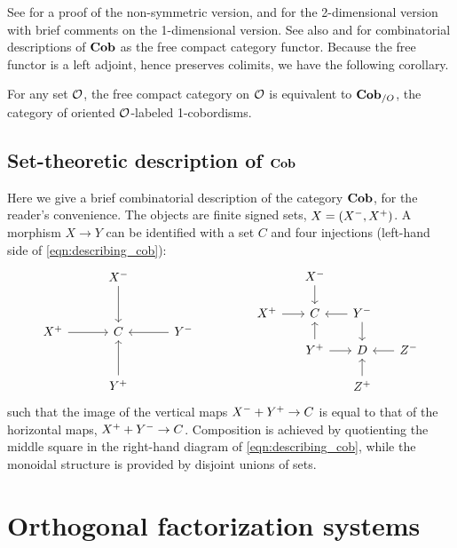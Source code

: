 \documentclass[11pt,oneside,article]{memoir}
\begin{document}
See \cite[Theorem 3.6]{FreydYetter} for a proof of the non-symmetric version, \cite{Kock} and
\cite{BaezDolan} for the 2-dimensional version with brief comments on the 1-dimensional version. See
also \cite{KellyLaplaza} and \cite{Abramsky2} for combinatorial descriptions of $\mathbf{Cob}$ as the free
compact category functor.  Because the free functor is a left adjoint, hence preserves colimits, we
have the following corollary.

\begin{corollary}
      \label{cor:free_compact_is_Cob}
   For any set $\mathcal{O}$, the free compact category on $\mathcal{O}$ is equivalent to $\mathbf{Cob}_{/O}$, the
   category of oriented $\mathcal{O}$-labeled 1-cobordisms.
\end{corollary}

\subsection{Set-theoretic description of $\mathbf{Cob}$}

Here we give a brief combinatorial description of the category $\mathbf{Cob}$, for the reader's convenience.
The objects are finite signed sets, $X=(X^-,X^+)$. A morphism $X\to Y$ can be identified
with a set $C$ and four injections (left-hand side of \eqref{eqn:describing_cob}):
\begin{equation}
      \label{eqn:describing_cob}
\begin{tikzcd}[row sep=1cm, column sep = 1cm]
   &\inp{X}\ar[d]\\
   \outp{X}\ar[r]&C&\inp{Y}\ar[l]\\
   &\outp{Y}\ar[u]
\end{tikzcd}
\hspace{.6in}
\begin{tikzcd}[row sep=.5cm, column sep =.5cm]
   &\inp{X}\ar[d]\\
   \outp{X}\ar[r]&C&\inp{Y}\ar[l]\ar[d]\\
   &\outp{Y}\ar[u]\ar[r]&D&\inp{Z}\ar[l]\\
   &&\outp{Z}\ar[u]
\end{tikzcd}
\end{equation}
such that the image of the vertical maps $X^-+Y^+\to C$ is equal to that of the horizontal
maps, $X^++Y^-\to C$. Composition is achieved by quotienting the middle square in the
right-hand diagram of \eqref{eqn:describing_cob}, while the monoidal structure is provided by
disjoint unions of sets.

\section{Orthogonal factorization systems}
      \label{sec:factorization_systems}
\end{document}
